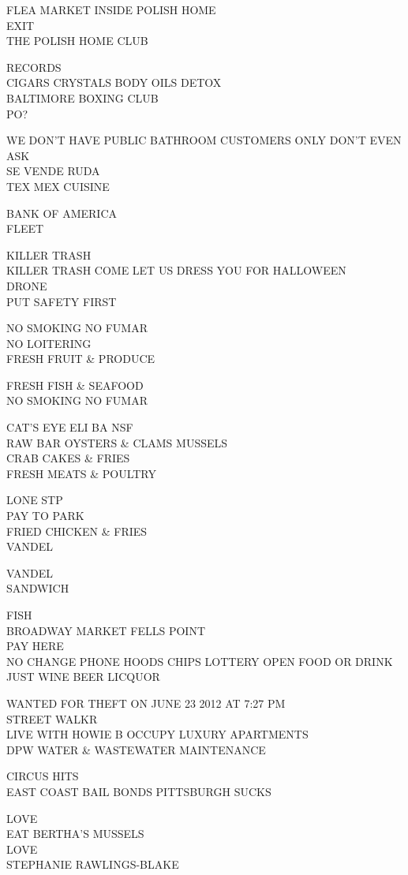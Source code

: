 \documentclass[10pt,letterpaper]{article}
\begin{document}
FLEA MARKET INSIDE POLISH HOME\\
EXIT\\
THE POLISH HOME CLUB

RECORDS\\
CIGARS CRYSTALS BODY OILS DETOX\\
BALTIMORE BOXING CLUB\\
PO?

WE DON'T HAVE PUBLIC BATHROOM CUSTOMERS ONLY DON'T EVEN ASK\\
SE VENDE RUDA\\
TEX MEX CUISINE

BANK OF AMERICA\\
FLEET

KILLER TRASH\\
KILLER TRASH COME LET US DRESS YOU FOR HALLOWEEN\\
DRONE\\
PUT SAFETY FIRST

NO SMOKING NO FUMAR\\
NO LOITERING\\
FRESH FRUIT \& PRODUCE

FRESH FISH \& SEAFOOD\\
NO SMOKING NO FUMAR

CAT'S EYE ELI BA NSF\\
RAW BAR OYSTERS \& CLAMS MUSSELS\\
CRAB CAKES \& FRIES\\
FRESH MEATS \& POULTRY

LONE STP\\
PAY TO PARK\\
FRIED CHICKEN \& FRIES\\
VANDEL

VANDEL\\
SANDWICH

FISH\\
BROADWAY MARKET FELLS POINT\\
PAY HERE\\
NO CHANGE PHONE HOODS CHIPS LOTTERY OPEN FOOD OR DRINK JUST WINE BEER LICQUOR

WANTED FOR THEFT ON JUNE 23 2012 AT 7:27 PM\\
STREET WALKR\\
LIVE WITH HOWIE B OCCUPY LUXURY APARTMENTS\\
DPW WATER \& WASTEWATER MAINTENANCE

CIRCUS HITS\\
EAST COAST BAIL BONDS PITTSBURGH SUCKS

LOVE\\
EAT BERTHA'S MUSSELS\\
LOVE\\
STEPHANIE RAWLINGS{-}BLAKE
\end{document}
